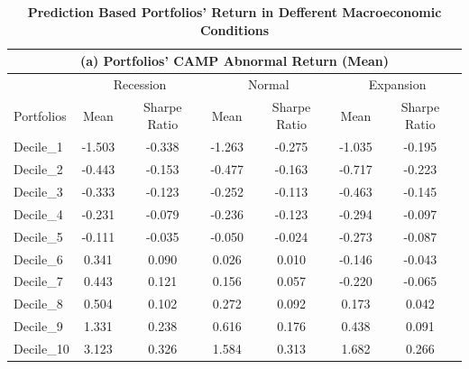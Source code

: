 \begin{table}[H]
  \centering
  \caption{\textbf{Prediction Based Portfolios' Return in Defferent Macroeconomic Conditions}}
  \begin{tabular}{l|cc|cc|cc}
  \hline
      \multicolumn{7}{c}{(a) Portfolios' CAMP Abnormal Return (Mean)}\\\hline
      ~ & \multicolumn{2}{c}{Recession} & \multicolumn{2}{c}{Normal} & \multicolumn{2}{c}{Expansion} \\ \cline{2-7}
      Portfolios & Mean & Sharpe Ratio & Mean & Sharpe Ratio & Mean & Sharpe Ratio \\ \hline
      Decile\_1 & -1.503 & -0.338 & -1.263 & -0.275 & -1.035 & -0.195 \\ 
      Decile\_2 & -0.443 & -0.153 & -0.477 & -0.163 & -0.717 & -0.223 \\ 
      Decile\_3 & -0.333 & -0.123 & -0.252 & -0.113 & -0.463 & -0.145 \\ 
      Decile\_4 & -0.231 & -0.079 & -0.236 & -0.123 & -0.294 & -0.097 \\ 
      Decile\_5 & -0.111 & -0.035 & -0.050 & -0.024 & -0.273 & -0.087 \\ 
      Decile\_6 & 0.341 & 0.090 & 0.026 & 0.010 & -0.146 & -0.043 \\ 
      Decile\_7 & 0.443 & 0.121 & 0.156 & 0.057 & -0.220 & -0.065 \\ 
      Decile\_8 & 0.504 & 0.102 & 0.272 & 0.092 & 0.173 & 0.042 \\ 
      Decile\_9 & 1.331 & 0.238 & 0.616 & 0.176 & 0.438 & 0.091 \\ 
      Decile\_10 & 3.123 & 0.326 & 1.584 & 0.313 & 1.682 & 0.266 \\  \hline


\end{tabular}
\end{table}
